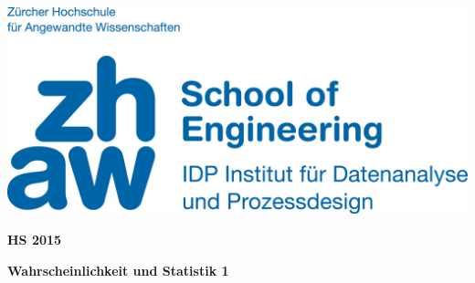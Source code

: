 \noindent
\begin{minipage}[t]{0.4\textwidth} 
\includegraphics[width=\linewidth]{logo.jpg}
\end{minipage}%
\hfill%
\begin{minipage}[t]{0.4\textwidth}\raggedleft
\textbf{\large HS 2015}
\end{minipage}

\begin{center}
 \textbf{\large Wahrscheinlichkeit und Statistik 1} \\
 \vspace{0.3cm}
\end{center}
